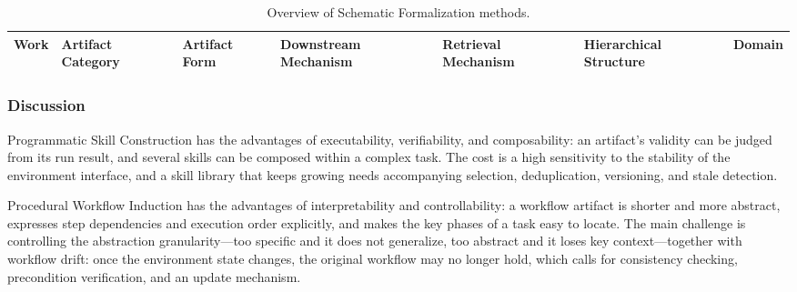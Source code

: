 \begin{table}[t]
\centering
\caption{Overview of Schematic Formalization methods.}
\label{tab:schematic-formalization}
\scriptsize
\begin{tabular}{@{}lllllll@{}}
\toprule
Work & Artifact Category & Artifact Form & Downstream Mechanism & Retrieval Mechanism & Hierarchical Structure & Domain \\
\midrule
\bottomrule
\end{tabular}
\end{table}

\subsubsection{Discussion}

Programmatic Skill Construction has the advantages of executability, verifiability, and composability: an artifact's validity can be judged from its run result, and several skills can be composed within a complex task. The cost is a high sensitivity to the stability of the environment interface, and a skill library that keeps growing needs accompanying selection, deduplication, versioning, and stale detection.

Procedural Workflow Induction has the advantages of interpretability and controllability: a workflow artifact is shorter and more abstract, expresses step dependencies and execution order explicitly, and makes the key phases of a task easy to locate. The main challenge is controlling the abstraction granularity---too specific and it does not generalize, too abstract and it loses key context---together with workflow drift: once the environment state changes, the original workflow may no longer hold, which calls for consistency checking, precondition verification, and an update mechanism.


